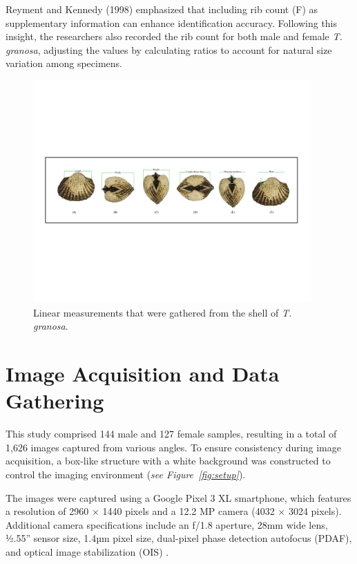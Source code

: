 Reyment and Kennedy (1998) emphasized that including rib count (F) as supplementary information can enhance identification accuracy. Following this insight, the researchers also recorded the rib count for both male and female \textit{T. granosa}, adjusting the values by calculating ratios to account for natural size variation among specimens.

\begin{figure}[!htbp]
	\centering
	\includegraphics[width=0.95\textwidth]{figures/linear_measurements.png}
	\caption{Linear measurements that were gathered from the shell of \textit{T. granosa}.}
	\label{fig:linear_measurements}
\end{figure}

\section{Image Acquisition and Data Gathering}
\label{sec:imageprocess}

This study comprised 144 male and 127 female \Tgranosa samples, resulting in a total of 1,626 images captured from various angles. To ensure consistency during image acquisition, a box-like structure with a white background was constructed to control the imaging environment (\textit{see Figure~\ref{fig:setup}}).

The images were captured using a Google Pixel 3 XL smartphone, which features a resolution of 2960 × 1440 pixels and a 12.2 MP camera (4032 × 3024 pixels). Additional camera specifications include an f/1.8 aperture, 28mm wide lens, ½.55” sensor size, 1.4µm pixel size, dual-pixel phase detection autofocus (PDAF), and optical image stabilization (OIS) \cite{concepcion2023}.

